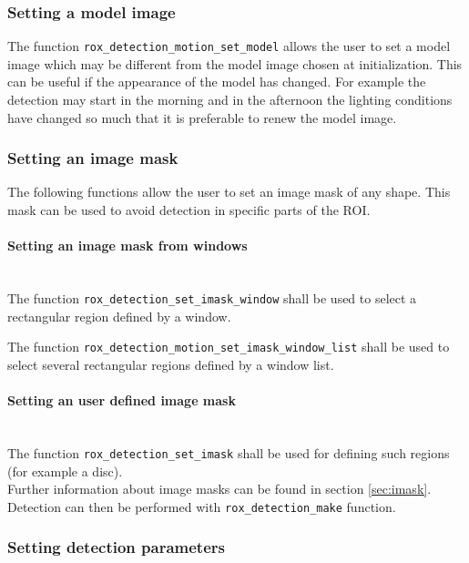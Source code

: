 \subsubsection{Setting a model image}
\label{sse:detection_set_model}

The function \lstinline$rox_detection_motion_set_model$ allows the
user to set a model image which may be different from the model image
chosen at initialization. This can be useful if the appearance of the
model has changed. For example the detection may start in the morning
and in the afternoon the lighting conditions have changed so much
that it is preferable to renew the model image.\\

\subsubsection{Setting an image mask}
\label{sse:detection_set_imask}

The following functions allow the user to set an image mask of any shape. This mask can be used to avoid
detection in specific parts of the ROI. \\

\paragraph{Setting an image mask from windows}
\label{sss:detection_set_imask_windows}
~\\
The function \lstinline$rox_detection_set_imask_window$ shall be used
to select a rectangular region defined by a window.

The function \lstinline$rox_detection_motion_set_imask_window_list$ shall be used to select several rectangular regions defined by a window list.

\paragraph{Setting an user defined image mask}
\label{sss:detection_set_imask_user}
~\\

The function \lstinline$rox_detection_set_imask$ shall be used for defining such regions (for example a disc).\\
Further information about image masks can be found in section \ref{sec:imask}. Detection can then be performed with
\lstinline$rox_detection_make$ function.

\subsubsection{Setting detection parameters}
\label{sse:detection_set_params}

